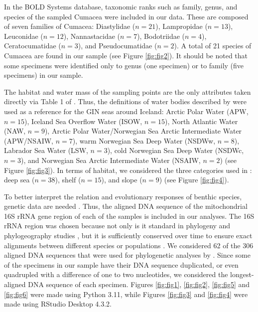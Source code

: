 In the BOLD Systems database, taxonomic ranks such as family, genus, and species of the sampled Cumacea were included in our data. These are composed of seven families of Cumacea: Diastylidae ($n=21$), Lampropidae ($n=13$), Leuconidae ($n=12$), Nannastacidae ($n=7$), Bodotriidae ($n=4$), Ceratocumatidae ($n=3$), and Pseudocumatidae ($n=2$). A total of 21 species of Cumacea are found in our sample (see Figure \ref{fig:fig2}). It should be noted that some specimens were identified only to genus (one specimen) or to family (five specimens) in our sample.

The habitat and water mass of the sampling points are the only attributes taken directly via Table 1 of \citep{uhlir_adding_2021}. Thus, the definitions of water bodies described by \citep{hansen_north_2000, brix2010distribution, ostmann_marine_2014} were used as a reference for the GIN seas around Iceland: Arctic Polar Water (APW, $n=15$), Iceland Sea Overflow Water (ISOW, $n=15$), North Atlantic Water (NAW, $n=9$), Arctic Polar Water/Norwegian Sea Arctic Intermediate Water (APW/NSAIW, $n=7$), warm Norwegian Sea Deep Water (NSDWw, $n=8$), Labrador Sea Water (LSW, $n=3$), cold Norwegian Sea Deep Water (NSDWc, $n=3$), and Norwegian Sea Arctic Intermediate Water (NSAIW, $n=2$) (see Figure \ref{fig:fig3}). In terms of habitat, we considered the three categories used in \citep{uhlir_adding_2021}: deep sea ($n=38$), shelf ($n=15$), and slope ($n=9$) (see Figure \ref{fig:fig4}).

To better interpret the relation and evolutionary responses of benthic species, genetic data are needed \citep{wilson_speciation_1987, uhlir_adding_2021}. Thus, the aligned DNA sequence of the mitochondrial 16S rRNA gene region of each of the samples is included in our analyses. The 16S rRNA region was chosen because not only is it standard in phylogeny and phylogeography studies \citep{hugenholtz1998impact}, but it is sufficiently conserved over time to ensure exact alignments between different species or populations \citep{saccone1999evolutionary}. We considered 62 of the 306 aligned DNA sequences that were used for phylogenetic analyses by \citep{uhlir_adding_2021}. Since some of the specimens in our sample have their DNA sequence duplicated, or even quadrupled with a difference of one to two nucleotides, we considered the longest-aligned DNA sequence of each specimen. Figures \ref{fig:fig1}, \ref{fig:fig2}, \ref{fig:fig5} and \ref{fig:fig6} were made using Python 3.11, while Figures \ref{fig:fig3} and \ref{fig:fig4} were made using RStudio Desktop 4.3.2.

